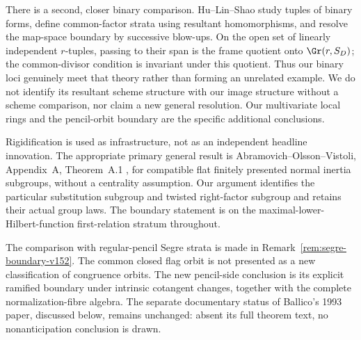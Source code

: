 \documentclass[11pt,reqno]{amsart}
\numberwithin{equation}{section}
\theoremstyle{definition}\newtheorem{definition}[theorem]{Definition}
\theoremstyle{remark}\newtheorem{remark}[theorem]{Remark}
\begin{document}
There is a second, closer binary comparison.  Hu--Lin--Shao
\cite[\S2.2, Corollary~3.6, and Theorem~1.1]{HuLinShao2007}
study tuples of binary forms, define common-factor strata using
resultant homomorphisms, and resolve the map-space boundary by
successive blow-ups.  On the open set of linearly independent
$r$-tuples, passing to their span is the frame quotient onto
$\Gr(r,S_D)$; the common-divisor condition is invariant under this
quotient.  Thus our binary loci genuinely meet that theory rather
than forming an unrelated example.  We do not identify its
resultant scheme structure with our image structure without a
scheme comparison, nor claim a new general resolution.  Our
multivariate local rings and the pencil-orbit boundary are the
specific additional conclusions.

Rigidification is used as infrastructure, not as an independent
headline innovation.  The appropriate primary general result is
Abramovich--Olsson--Vistoli, Appendix~A, Theorem~A.1
\cite{AOV2008}, for compatible flat finitely presented normal
inertia subgroups, without a centrality assumption.  Our argument
identifies the particular substitution subgroup and twisted
right-factor subgroup and retains their actual group laws.  The
boundary statement is on the maximal-lower-Hilbert-function
first-relation stratum throughout.

The comparison with regular-pencil Segre strata is made in
Remark~\ref{rem:segre-boundary-v152}.  The common closed flag orbit
is not presented as a new classification of congruence orbits.
The new pencil-side conclusion is its explicit ramified boundary
under intrinsic cotangent changes, together with the complete
normalization-fibre algebra.  The separate documentary status of
Ballico's 1993 paper, discussed below, remains unchanged: absent
its full theorem text, no nonanticipation conclusion is drawn.
\end{document}
